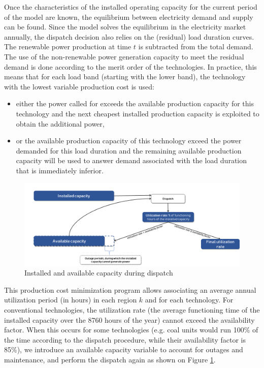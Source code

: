 Once the characteristics of the installed operating capacity for the current period of the model are known, the equilibrium between electricity demand and supply can be found.
Since the model solves the equilibrium in the electricity market annually, the dispatch decision also relies on the (residual) load duration curves. The renewable power production at time $t$ is subtracted from the total demand.
The use of the non-renewable power generation capacity to meet the residual demand is done according to the merit order of the technologies.
In practice, this means that for each load band (starting with the lower band), the technology with the lowest variable production cost is used:

\begin{itemize}
    \item either the power called for exceeds the available production capacity for this technology and the next cheapest installed production capacity is exploited to obtain the additional power,
    \item or the available production capacity of this technology exceed the power demanded for this load duration and the remaining available production capacity will be used to answer demand associated with the load duration that is immediately inferior.
\end{itemize}

\begin{figure}[H]
    \includegraphics[scale=0.4]{figures&tables/availb.png}
    \centering
    \caption{Installed and available capacity during dispatch}
    \label{fig:avail}
\end{figure}


This production cost minimization program allows associating an average annual utilization period (in hours) in each region $k$ and for each technology. For conventional technologies, the utilization rate (the average functioning time of the installed capacity over the 8760 hours of the year) cannot exceed the availability factor. When this occurs for some technologies (e.g. coal units would run 100\% of the time according to the dispatch procedure, while their availability factor is 85\%), we introduce an available capacity variable to account for outages and maintenance, and perform the dispatch again as shown on Figure \ref{fig:avail}.

